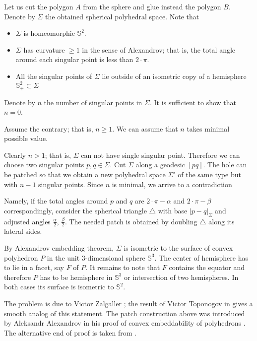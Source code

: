 Let us cut the polygon $A$ from the sphere and glue instead the polygon $B$.
Denote by $\Sigma$ the obtained spherical polyhedral space.
Note that 
\begin{itemize}
\item $\Sigma$ is homeomorphic $\mathbb S^2$.
\item $\Sigma$ has curvature $\ge 1$ in the sense of Alexandrov; that is, the total angle around each singular point is less than $2\cdot \pi$.
\item All the singular points of $\Sigma$ 
lie outside of an isometric copy of a hemisphere $\mathbb{S}^2_+\subset \Sigma$
\end{itemize}

Denote by $n$ the number of singular points in $\Sigma$.
It is sufficient to show that $n=0$.

Assume the contrary; that is, $n\ge 1$.
We can assume that $n$ takes minimal possible value.

Clearly $n>1$;
that is, $\Sigma$ can not have single singular point.
Therefore we can choose two singular points $p,q\in \Sigma$.
Cut $\Sigma$ along a geodesic $[pq]$.
The hole can be patched so that we obtain a new polyhedral space $\Sigma'$ of the same type but with $n-1$ singular points.
Since $n$ is minimal, we arrive to a contradiction

Namely, if the total angles around $p$ and $q$ are $2\cdot \pi-\alpha$ and $2\cdot \pi-\beta$ correspondingly,
consider the spherical triangle $\triangle$ with base $|p-q|_\Sigma$ and adjusted angles $\tfrac\alpha2$, $\tfrac\beta2$. 
The needed patch is obtained by doubling $\triangle$ along its lateral sides.
\qeds

By Alexandrov embedding theorem, $\Sigma$ is isometric to the surface of convex polyhedron $P$ in the unit 3-dimensional sphere $\mathbb S^3$. 
The center of hemisphere has to lie in a facet, say $F$ of $P$.
It remains to note that $F$ contains the equator and therefore $P$ has to be hemisphere in $\mathbb S^3$ or intersection of two hemispheres.
In both cases its surface is isometric to $\mathbb S^2$.
\qeds

The problem is due to Victor Zalgaller \cite[see][]{zalgaller-shperical-polygon};
the result of Victor Toponogov in \cite{toponogov} gives a smooth analog of this statement.
The patch construction above was introduced by 
Aleksandr Alexandrov
in his proof of convex embeddability of polyhedrons
\cite[see][VI, \S7]{alexandrov1948}.
The alternative end of proof is taken from \cite{panov-petrunin}.



